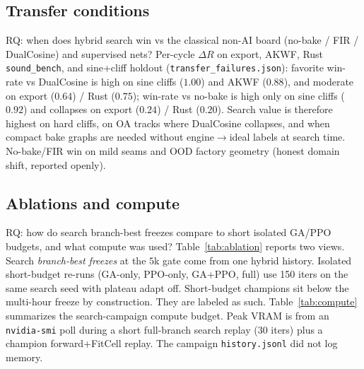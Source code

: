 \subsection{Transfer conditions}
\label{sec:transfer}

RQ: when does hybrid search win vs the classical non-AI board (no-bake / FIR / DualCosine) and supervised nets?
Per-cycle $\Delta R$ on export, AKWF, Rust \texttt{sound\_bench}, and sine{+}cliff holdout (\texttt{transfer\_failures.json}):
favorite win-rate vs DualCosine is high on sine cliffs ($1.00$) and AKWF ($0.88$), and moderate on export ($0.64$) / Rust ($0.75$);
win-rate vs no-bake is high only on sine cliffs ($0.92$) and collapses on export ($0.24$) / Rust ($0.20$).
Search value is therefore highest on hard cliffs, on OA tracks where DualCosine collapses, and when compact bake graphs are needed without engine$\to$ideal labels at search time.
No-bake/FIR win on mild seams and OOD factory geometry (honest domain shift, reported openly).

\subsection{Ablations and compute}
\label{sec:ablation-compute}

RQ: how do search branch-best freezes compare to short isolated GA/PPO budgets, and what compute was used?
Table~\ref{tab:ablation} reports two views. Search \emph{branch-best freezes} at the $5$k gate come from one hybrid history. Isolated short-budget re-runs (GA-only, PPO-only, GA{+}PPO, full) use 150 iters on the same search seed with plateau adapt off.
Short-budget champions sit below the multi-hour freeze by construction. They are labeled as such.
Table~\ref{tab:compute} summarizes the search-campaign compute budget. Peak VRAM is from an \texttt{nvidia-smi} poll during a short full-branch search replay (30 iters) plus a champion forward{+}FitCell replay. The campaign \texttt{history.jsonl} did not log memory.

